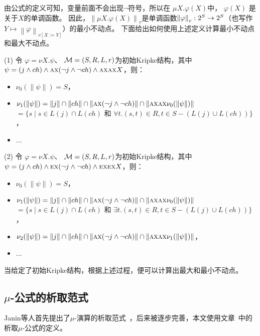 由公式的定义可知，变量前面不会出现$\neg$符号，所以在 $\mu X. \varphi(X)$中， $\varphi(X)$ 是关于$X$的单调函数。
因此，$\left\| \mu X. \varphi(X)\right\|_v$是单调函数$\left\| \varphi \right\|_{v}: 2^S\rightarrow 2^S$（也写作$Y \mapsto \left\| \varphi\right\|_{v[X:=Y]}$）的最小不动点。
下面给出如何使用上述定义计算最小不动点和最大不动点。
\begin{example}
	(1) 令 $\varphi=\nu X. \psi$、 ${\cal M}=(S, R, L,r)$为初始Kripke结构，其中$\psi = (j \wedge ch) \wedge \textsc{a}\textsc{x} (\neg j \wedge \neg ch) \wedge \textsc{a}\textsc{x} \textsc{a}\textsc{x} X$，则：
	\begin{itemize}
		\item $\nu_0(\left\| \psi \right\|) = S$，
		\item $\nu_1(\left\| \psi \right\|) = \left\| j \right\| \cap \left\| ch \right\| \cap \left\| \textsc{a}\textsc{x} (\neg j \wedge \neg ch) \right\| \cap \left\| \textsc{a}\textsc{x} \textsc{a}\textsc{x} \nu_0(\left\| \psi \right\|) \right\|$ $=\{s \mid s \in L(j) \cap L(ch)$ 和 $\forall t. (s, t) \in R, t \in S - (L(j) \cup L(ch))\}$，
		\item ...
	\end{itemize}
	(2) 令 $\varphi=\nu X. \psi$、 ${\cal M}=(S, R, L,r)$为初始Kripke结构，其中$\psi=(j \wedge ch) \wedge \textsc{e}\textsc{x} (\neg j \wedge \neg ch) \wedge \textsc{e}\textsc{x} \textsc{e}\textsc{x} X$，则：
	\begin{itemize}
		\item $\nu_0(\left\| \psi \right\|) = S$，
		\item $\nu_1(\left\| \psi \right\|) = \left\| j \right\| \cap \left\| ch \right\| \cap \left\| \textsc{a}\textsc{x} (\neg j \wedge \neg ch) \right\| \cap \left\| \textsc{a}\textsc{x} \textsc{a}\textsc{x} \nu_0(\left\| \psi \right\|) \right\|$ $=\{s \mid s \in L(j) \cap L(ch)$ 和 $\exists t. (s, t) \in R, t \in S - (L(j) \cup L(ch))\}$，
		\item $\nu_2(\left\| \psi \right\|) = \left\| j \right\| \cap \left\| ch \right\| \cap \left\| \textsc{a}\textsc{x} (\neg j \wedge \neg ch) \right\| \cap \left\| \textsc{a}\textsc{x} \textsc{a}\textsc{x} \nu_1(\left\| \psi \right\|) \right\|$，
		\item ...
	\end{itemize}
当给定了初始Kripke结构，根据上述过程，便可以计算出最大和最小不动点。
\end{example}


\subsection{$\mu$-公式的析取范式}
Janin等人首先提出了$\mu$-演算的析取范式~\cite{janin1995automata}，后来被逐步完善，本文使用文章~\cite{d2006modal}中的析取$\mu$-公式的定义。

